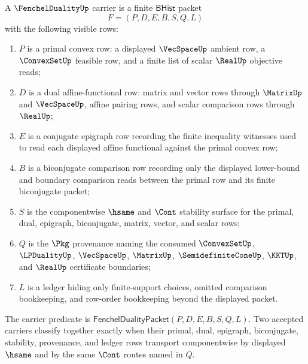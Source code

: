 \begin{definition}
\label{def:fenchelduality-bhist-carrier}
A $\FenchelDualityUp$ carrier is a finite $\mathsf{BHist}$ packet
$$
F=(P,D,E,B,S,Q,L)
$$
with the following visible rows:
\begin{enumerate}
\item $P$ is a primal convex row: a displayed $\VecSpaceUp$ ambient row, a $\ConvexSetUp$ feasible row, and a finite list of scalar $\RealUp$ objective reads;
\item $D$ is a dual affine-functional row: matrix and vector rows through $\MatrixUp$ and $\VecSpaceUp$, affine pairing rows, and scalar comparison rows through $\RealUp$;
\item $E$ is a conjugate epigraph row recording the finite inequality witnesses used to read each displayed affine functional against the primal convex row;
\item $B$ is a biconjugate comparison row recording only the displayed lower-bound and boundary comparison reads between the primal row and its finite biconjugate packet;
\item $S$ is the componentwise $\hsame$ and $\Cont$ stability surface for the primal, dual, epigraph, biconjugate, matrix, vector, and scalar rows;
\item $Q$ is the $\Pkg$ provenance naming the consumed $\ConvexSetUp$, $\LPDualityUp$, $\VecSpaceUp$, $\MatrixUp$, $\SemidefiniteConeUp$, $\KKTUp$, and $\RealUp$ certificate boundaries;
\item $L$ is a ledger hiding only finite-support choices, omitted comparison bookkeeping, and row-order bookkeeping beyond the displayed packet.
\end{enumerate}
The carrier predicate is $\mathsf{FenchelDualityPacket}(P,D,E,B,S,Q,L)$. Two accepted carriers classify together exactly when their primal, dual, epigraph, biconjugate, stability, provenance, and ledger rows transport componentwise by displayed $\hsame$ and by the same $\Cont$ routes named in $Q$.
\end{definition}

